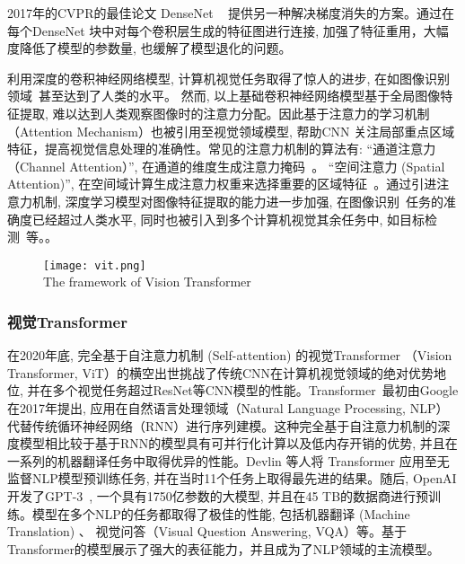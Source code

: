 2017年的CVPR的最佳论文 DenseNet ~\cite{huang2017densely} 提供另一种解决梯度消失的方案。通过在每个DenseNet 块中对每个卷积层生成的特征图进行连接, 加强了特征重用，大幅度降低了模型的参数量, 也缓解了模型退化的问题。 \par
利用深度的卷积神经网络模型, 计算机视觉任务取得了惊人的进步, 在如图像识别领域~\cite{xiebaojian,hongtao16,yafeili18,changliang16, chuminnan15, zhuangzhuang16}甚至达到了人类的水平。 然而, 以上基础卷积神经网络模型基于全局图像特征提取, 难以达到人类观察图像时的注意力分配。因此基于注意力的学习机制 （Attention Mechanism）也被引用至视觉领域模型, 帮助CNN 关注局部重点区域特征，提高视觉信息处理的准确性。常见的注意力机制的算法有: ``通道注意力（Channel Attention）'', 在通道的维度生成注意力掩码~\cite{hu2018squeeze,liu2022spatial, zhang2018context,gao2019global,yang2020gated, chen2019you}。 ``空间注意力 (Spatial Attention)'', 在空间域计算生成注意力权重来选择重要的区域特征~\cite{wang2018non,gregor2015draw,mnih2014recurrent, jaderberg2015spatial}。通过引进注意力机制, 深度学习模型对图像特征提取的能力进一步加强, 在图像识别~\cite{zzl2019, zhangwenxiu,xucongan21 }任务的准确度已经超过人类水平, 同时也被引入到多个计算机视觉其余任务中, 如目标检测~\cite{hongyanli19,jmr2021, lsen2021, xc2019, zwq2020 }等。。
\begin{figure}[!htp]
    \centering
    \texttt{[image: vit.png]} \\
      {The framework of Vision Transformer}
   \label{fig:vit}
  \end{figure}

\subsubsection{视觉Transformer}
在2020年底, 完全基于自注意力机制 (Self-attention) 的视觉Transformer （Vision Transformer, ViT）的横空出世挑战了传统CNN在计算机视觉领域的绝对优势地位, 并在多个视觉任务超过ResNet等CNN模型的性能。Transformer~\cite{vaswani2017attention}最初由Google在2017年提出, 应用在自然语言处理领域（Natural Language Processing, NLP）代替传统循环神经网络（RNN）进行序列建模。这种完全基于自注意力机制的深度模型相比较于基于RNN的模型具有可并行化计算以及低内存开销的优势, 并且在一系列的机器翻译任务中取得优异的性能。Devlin 等人将 Transformer \cite{devlin2018bert} 应用至无监督NLP模型预训练任务, 并在当时11个任务上取得最先进的结果。随后, OpenAI开发了GPT-3~\cite{brown2020language}, 一个具有1750亿参数的大模型, 并且在45 TB的数据商进行预训练。模型在多个NLP的任务都取得了极佳的性能, 包括机器翻译 (Machine Translation) 、 视觉问答（Visual Question Answering, VQA）等。基于Transformer的模型展示了强大的表征能力，并且成为了NLP领域的主流模型。\par

